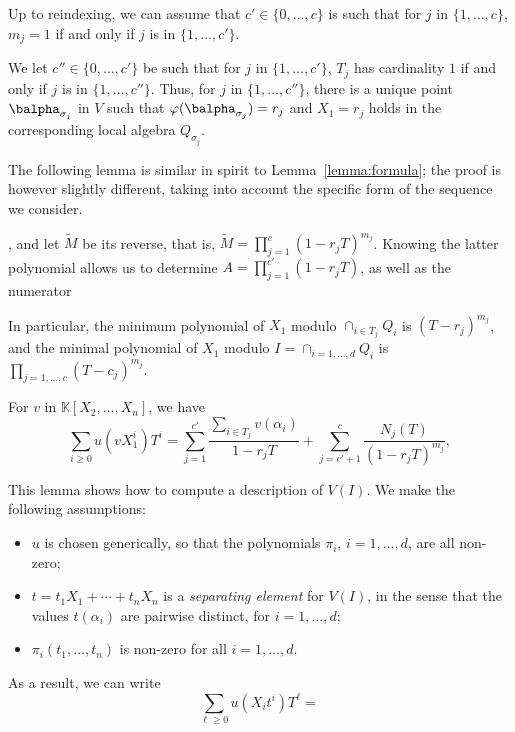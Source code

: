 \documentclass[12pt]{article}
\def\K {\ensuremath{\mathbb{K}}}
\newtheorem{Lemma}{Lemma}
\begin{document}
Up to reindexing, we can assume that $c' \in \{0,\dots,c\}$ is such
that for $j$ in $\{1,\dots,c\}$, $m_j=1$ if and only if $j$ is in
$\{1,\dots,c'\}$.

We let $c'' \in \{0,\dots,c'\}$
be such that for $j$ in $\{1,\dots,c'\}$, $T_j$ has cardinality $1$ if
and only if $j$ is in $\{1,\dots,c''\}$. Thus, for $j$ in
$\{1,\dots,c''\}$, there is a unique point $\balpha_{\sigma_j}$ in $V$ such
that $\varphi(\balpha_{\sigma_j})=r_j$ and $X_1=r_j$ holds in 
the corresponding local algebra $Q_{\sigma_j}$.

The following lemma is similar in spirit to Lemma~\ref{lemma:formula};
the proof is however slightly different, taking into account the
specific form of the sequence we consider.

, and let $\tilde M$ 
be its reverse, that is, $\tilde M=\prod_{j=1}^c (1-r_jT)^{m_j}$.
Knowing the latter polynomial allows us to 
determine $A=\prod_{j=1}^{c'} (1-r_jT)$, as well as the 
numerator






 In particular, the minimum
polynomial of $X_1$ modulo $\cap_{i \in T_j} Q_i$ is $(T-r_j)^{m_j}$,
and the minimal polynomial of $X_1$ modulo $I=\cap_{i=1,\dots,d} Q_i$
is $\prod_{j=1,\dots,c} (T-c_j)^{m_j}$.

 For $v$ in $\K[X_2,\dots,X_n]$, we have
$$\sum_{i \ge 0} u(v X_1^i)T^i = \sum_{j=1}^{c'} \frac{\sum_{i \in T_j} v(\alpha_i)}{1-r_j T}
+\sum_{j=c'+1}^{c} \frac{N_j(T)}{(1-r_j T)^{m_j}},$$










This lemma shows how to compute a description of $V(I)$. We make
the following assumptions:
\begin{itemize}
\item $u$ is chosen generically, so that the polynomials $\pi_i$,
  $i=1,\dots,d$, are all non-zero;
\item $t=t_1 X_1 + \cdots + t_n X_n$ is a {\em separating element} for
  $V(I)$, in the sense that the values $t(\alpha_i)$ are pairwise
  distinct, for $i=1,\dots,d$;
\item $\pi_i(t_1,\dots,t_n)$ is non-zero for all $i=1,\dots,d$.
\end{itemize}
As a result, we can write
$$\sum_{\ell \ge 0} u(X_i t^i)T^\ell = \frac{ }{ }$$
\end{document}
